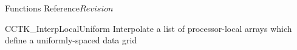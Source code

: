\begin{cactuspart}{ Functions Reference}{}{$Revision$}


\begin{FunctionDescription}{CCTK\_InterpLocalUniform}
\label{CCTK-InterpLocalUniform}
Interpolate a list of processor-local arrays
which define a uniformly-spaced data grid


\end{FunctionDescription}
\end{cactuspart}
